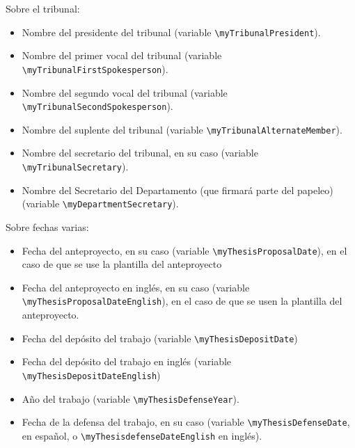 {\begin{itemize}
  \end{itemize}

  Sobre el tribunal:

  \begin{itemize}

    \item Nombre del presidente del tribunal (variable \texttt{\textbackslash{}myTribunalPresident}).
    \item Nombre del primer vocal del tribunal (variable \texttt{\textbackslash{}myTribunalFirstSpokesperson}).
    \item Nombre del segundo vocal del tribunal (variable \texttt{\textbackslash{}myTribunalSecondSpokesperson}).
    \item Nombre del suplente del tribunal (variable \texttt{\textbackslash{}myTribunalAlternateMember}).
    \item Nombre del secretario del tribunal, en su caso (variable \texttt{\textbackslash{}myTribunalSecretary}).
    \item Nombre del Secretario del Departamento (que firmará parte del papeleo) (variable \texttt{\textbackslash{}myDepartmentSecretary}).

  \end{itemize}

  Sobre fechas varias:

  \begin{itemize}

    \item Fecha del anteproyecto, en su caso (variable \texttt{\textbackslash{}myThesisProposalDate}), en el caso de que se use la plantilla del anteproyecto
    \item Fecha del anteproyecto en inglés, en su caso (variable \texttt{\textbackslash{}myThesisProposalDateEnglish}), en el caso de que se usen la plantilla del anteproyecto.

    \item Fecha del depósito del trabajo (variable \texttt{\textbackslash{}myThesisDepositDate})
    \item Fecha del depósito del trabajo en inglés (variable \texttt{\textbackslash{}myThesisDepositDateEnglish})

    \item Año del trabajo (variable \texttt{\textbackslash{}myThesisDefenseYear}).
    \item Fecha de la defensa del trabajo, en su caso (variable \texttt{\textbackslash{}myThesisDefenseDate}, en español, o \texttt{\textbackslash{}myThesisdefenseDateEnglish} en inglés).


\end{itemize}}
